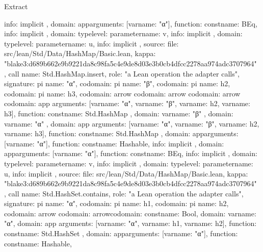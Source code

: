 \begin{lexlean}{Extract}
\begin{toolingmodule}
{{{{{{              info: implicit
            },
            domain: app{arguments: [var{name: "α"}], function: const{name: BEq}},
            info: implicit
          },
          domain: type{level: parameter{name: v}},
          info: implicit
        },
        domain: type{level: parameter{name: u}},
        info: implicit
      },
      source: {
        file: src/lean/Std/Data/HashMap/Basic.lean,
        kappa: "blake3:d689b662e9b9221da8c98fa5c4e9de8d03e3b0cb4dfcc2278aa974adc3707964"
      }
    },
    call{
      name: Std.HashMap.insert,
      role: "a Lean operation the adapter calls",
      signature: pi{
        name: "α",
        codomain: pi{
          name: "β",
          codomain: pi{
            name: h2,
            codomain: pi{
              name: h3,
              codomain: arrow{
                codomain: arrow{
                  codomain: arrow{
                    codomain: app{
                      arguments: [var{name: "α"}, var{name: "β"}, var{name: h2}, var{name: h3}],
                      function: const{name: Std.HashMap}
                    },
                    domain: var{name: "β"}
                  },
                  domain: var{name: "α"}
                },
                domain: app{
                  arguments: [var{name: "α"}, var{name: "β"}, var{name: h2}, var{name: h3}],
                  function: const{name: Std.HashMap}
                }
              },
              domain: app{arguments: [var{name: "α"}], function: const{name: Hashable}},
              info: implicit
            },
            domain: app{arguments: [var{name: "α"}], function: const{name: BEq}},
            info: implicit
          },
          domain: type{level: parameter{name: v}},
          info: implicit
        },
        domain: type{level: parameter{name: u}},
        info: implicit
      },
      source: {
        file: src/lean/Std/Data/HashMap/Basic.lean,
        kappa: "blake3:d689b662e9b9221da8c98fa5c4e9de8d03e3b0cb4dfcc2278aa974adc3707964"
      }
    },
    call{
      name: Std.HashSet.contains,
      role: "a Lean operation the adapter calls",
      signature: pi{
        name: "α",
        codomain: pi{
          name: h1,
          codomain: pi{
            name: h2,
            codomain: arrow{
              codomain: arrow{codomain: const{name: Bool}, domain: var{name: "α"}},
              domain: app{
                arguments: [var{name: "α"}, var{name: h1}, var{name: h2}],
                function: const{name: Std.HashSet}
              }
            },
            domain: app{arguments: [var{name: "α"}], function: const{name: Hashable}},
}}}}}
\end{toolingmodule}
\end{lexlean}
